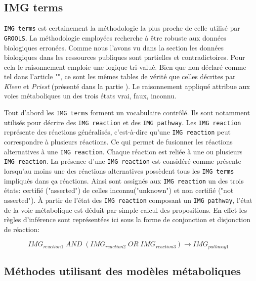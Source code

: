 \begin{refsegment}
    \subsection{IMG terms}
    
    \texttt{IMG terms} \cite{chen2013improving} est certainement la méthodologie la plus proche de celle utilisé par \texttt{\gls{GROOLS}}. La méthodologie employées recherche à être robuste aux données biologiques  erronées. Comme nous l'avons vu dans la section  les données biologiques dans les ressources publiques sont partielles et contradictoires. Pour cela le raisonnement emploie une logique tri-valué. Bien que non déclaré comme tel dans l'article "", ce sont les mêmes tables de vérité que celles décrites par \textit{Kleen} et \textit{Priest} (présenté dans la partie ). Le raisonnement appliqué attribue aux voies métaboliques un des trois états vrai, faux, inconnu.
    
    Tout d'abord les \texttt{IMG terms} forment un vocabulaire contrôlé. Ils sont notamment utilisés pour décrire des \texttt{IMG reaction}  et des \texttt{IMG pathway}. Les \texttt{IMG reaction} représente des réactions généralisés, c'est-à-dire qu'une \texttt{IMG reaction} peut correspondre à plusieurs réactions. Ce qui permet de fusionner les réactions alternatives à une \texttt{IMG reaction}. Chaque réaction est reliée à une ou plusieurs \texttt{IMG reaction}. La présence d'une \texttt{IMG reaction} est considéré comme présente lorsqu'au moins une des réactions alternatives possèdent tous les \texttt{IMG terms} impliqués dans ça réactions. Ainsi sont assignés aux \texttt{IMG reaction} un des trois états: certifié ("asserted") de celles inconnu("unknown") et non certifié ("not asserted"). À partir de l'état des \texttt{IMG reaction} composant un  \texttt{IMG pathway}, l'état de la voie métabolique est déduit par simple calcul des propositions. En effet les règles d'inférence sont représentées ici sous la forme de conjonction et disjonction de réaction:
    
    \begin{equation}
        IMG_{reaction1} \; AND \; (IMG_{reaction2} \; OR \; IMG_{reaction3} ) \to IMG_{pathway 1}
    \end{equation}
    
    \subsection{Méthodes utilisant des modèles métaboliques}
    

\end{refsegment}
